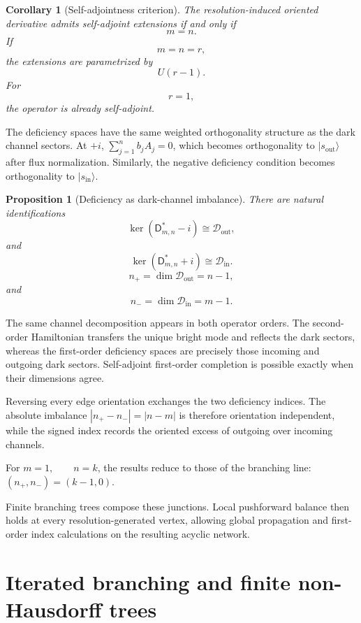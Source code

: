 \documentclass[11pt]{article}
\theoremstyle{plain}
\newtheorem{proposition}[theorem]{Proposition}
\newtheorem{corollary}[theorem]{Corollary}
\theoremstyle{definition}
\begin{document}
\begin{corollary}[Self-adjointness criterion]
\label{cor:Bmn-SA-criterion}
The resolution-induced oriented derivative admits self-adjoint extensions if and only
if
\[
  m=n.
\]
If
\[
  m=n=r,
\]
the extensions are parametrized by
\[
  U(r-1).
\]
For
\[
  r=1,
\]
the operator is already self-adjoint.
\end{corollary}

The deficiency spaces have the same weighted orthogonality structure as the
dark channel sectors. At \(+i\),
\(\sum_{j=1}^{n}b_jA_j=0\),
which becomes orthogonality to
\(|s_{\mathrm{out}}\rangle\) after flux normalization. Similarly, the
negative deficiency condition becomes orthogonality to
\(|s_{\mathrm{in}}\rangle\).

\begin{proposition}[Deficiency as dark-channel imbalance]
\label{prop:Bmn-dark-deficiency}
There are natural identifications
\[
  \ker(\mathsf D_{m,n}^*-i)
  \cong
  \mathcal D_{\mathrm{out}},
\]
and
\[
  \ker(\mathsf D_{m,n}^*+i)
  \cong
  \mathcal D_{\mathrm{in}}.
\]
\[
  n_+
  =
  \dim\mathcal D_{\mathrm{out}}
  =
  n-1,
\]
and
\[
  n_-
  =
  \dim\mathcal D_{\mathrm{in}}
  =
  m-1.
\]
\end{proposition}

The same channel decomposition appears in both operator orders. The
second-order Hamiltonian transfers the unique bright mode and reflects the
dark sectors, whereas the first-order deficiency spaces are precisely those
incoming and outgoing dark sectors. Self-adjoint first-order completion is
possible exactly when their dimensions agree.

Reversing every edge orientation exchanges the two deficiency indices. The
absolute imbalance \(|n_+-n_-| = |n-m|\) is therefore orientation independent, while the signed index records the
oriented excess of outgoing over incoming channels.

For
\(m=1, \qquad n=k\),
the results reduce to those of the branching line:
\((n_+,n_-) = (k-1,0)\).

Finite branching trees compose these junctions. Local pushforward balance
then holds at every resolution-generated vertex, allowing global propagation
and first-order index calculations on the resulting acyclic network.
\section{Iterated branching and finite non-Hausdorff trees}
\label{sec:trees}
\end{document}
